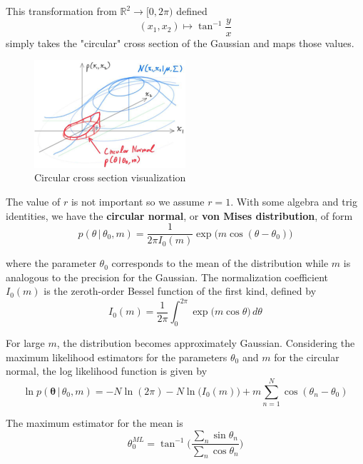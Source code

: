 \documentclass{article}
\begin{document}
    This transformation from $\mathbb{R}^2 \longrightarrow [0, 2\pi)$ defined
    \begin{equation}
      (x_1, x_2) \mapsto \tan^{-1} \frac{y}{x}
    \end{equation}
    simply takes the "circular" cross section of the Gaussian and maps those values.

    \begin{figure}[H]
      \centering
      \includegraphics[width=0.5\textwidth]{img/Circular_Cross_Section.jpg}
      \caption{Circular cross section visualization}
    \end{figure}

    The value of $r$ is not important so we assume $r=1$. With some algebra and trig identities, we have the \textbf{circular normal}, or \textbf{von Mises distribution}, of form
    \begin{equation}
      p(\theta\,|\,\theta_0, m) = \frac{1}{2\pi I_0(m)} \exp \big( m \cos(\theta - \theta_0) \big)
    \end{equation}

    where the parameter $\theta_0$ corresponds to the mean of the distribution while $m$ is analogous to the precision for the Gaussian. The normalization coefficient $I_0(m)$ is the zeroth-order Bessel function of the first kind, defined by
    \begin{equation}
      I_0(m) = \frac{1}{2\pi} \int_0^{2\pi} \exp \big( m \cos{\theta}\big) \, d\theta
    \end{equation}

    For large $m$, the distribution becomes approximately Gaussian. Considering the maximum likelihood estimators for the parameters $\theta_0$ and $m$ for the circular normal, the log likelihood function is given by
    \begin{equation}
      \ln p(\mathbf{\theta}\,|\, \theta_0, m) = -N \ln(2\pi) - N \ln \big( I_0(m)\big) + m \sum_{n=1}^N \cos(\theta_n - \theta_0)
    \end{equation}

    The maximum estimator for the mean is
    \begin{equation}
      \theta_{0}^{ML} = \tan^{-1} \bigg( \frac{\sum_n \sin{\theta_n}}{\sum_n \cos{\theta_n}} \bigg)
    \end{equation}
\end{document}
